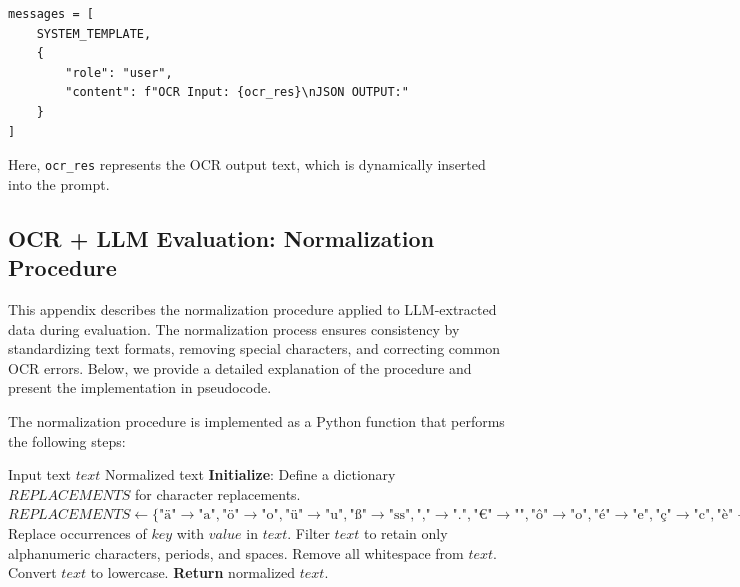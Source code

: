 \documentclass[11pt]{article}
\begin{document}
\begin{verbatim}
messages = [
    SYSTEM_TEMPLATE,
    {
        "role": "user",
        "content": f"OCR Input: {ocr_res}\nJSON OUTPUT:"
    }
]
\end{verbatim}

Here, \texttt{ocr\_res} represents the OCR output text, which is dynamically inserted into the prompt.

\subsection{OCR + LLM Evaluation: Normalization Procedure}
\label{app:ocr_llm_normalization}

This appendix describes the normalization procedure applied to LLM-extracted data during evaluation. The normalization process ensures consistency by standardizing text formats, removing special characters, and correcting common OCR errors. Below, we provide a detailed explanation of the procedure and present the implementation in pseudocode.

The normalization procedure is implemented as a Python function that performs the following steps:

\begin{algorithm}[H]
\caption{Text Normalization Procedure}
\label{alg:final_normalization}
\begin{algorithmic}[1]
\Require Input text $text$
\Ensure Normalized text
\State \textbf{Initialize}: Define a dictionary $REPLACEMENTS$ for character replacements.
\State $REPLACEMENTS \gets \{
    \text{"ä"} \rightarrow \text{"a"}, \text{"ö"} \rightarrow \text{"o"}, \text{"ü"} \rightarrow \text{"u"}, 
    \text{"ß"} \rightarrow \text{"ss"}, \text{","} \rightarrow \text{"."}, \text{"€"} \rightarrow \text{""}, 
    \text{"ô"} \rightarrow \text{"o"}, \text{"é"} \rightarrow \text{"e"}, \text{"ç"} \rightarrow \text{"c"}, 
    \text{"è"} \rightarrow \text{"e"}, \text{"à"} \rightarrow \text{"a"}, \text{"ê"} \rightarrow \text{"e"}, 
    \text{"â"} \rightarrow \text{"a"}, \text{"û"} \rightarrow \text{"u"}, \text{"î"} \rightarrow \text{"i"}, 
    \text{"ë"} \rightarrow \text{"e"}, \text{"ï"} \rightarrow \text{"i"}, \text{"œ"} \rightarrow \text{"oe"}, 
    \text{"æ"} \rightarrow \text{"ae"}, \text{"ù"} \rightarrow \text{"u"}
\}$
    \State Replace occurrences of $key$ with $value$ in $text$.
\EndFor
\State Filter $text$ to retain only alphanumeric characters, periods, and spaces.
\State Remove all whitespace from $text$.
\State Convert $text$ to lowercase.
\State \textbf{Return} normalized $text$.
\end{algorithmic}
\end{algorithm}
\end{document}
